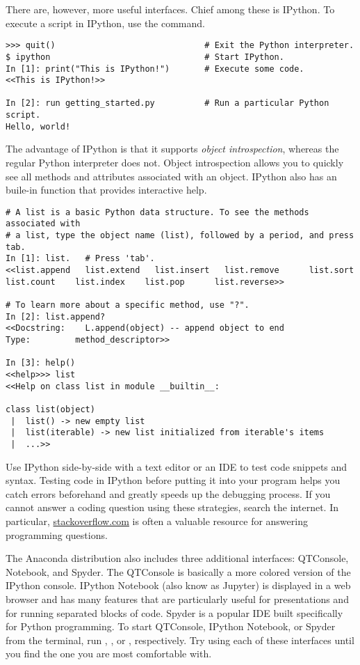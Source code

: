 There are, however, more useful interfaces.
Chief among these is IPython.
To execute a script in IPython, use the  command.

\begin{lstlisting}
>>> quit()                              # Exit the Python interpreter.
$ ipython                               # Start IPython.
In [1]: print("This is IPython!")       # Execute some code.
<<This is IPython!>>

In [2]: run getting_started.py          # Run a particular Python script.
Hello, world!
\end{lstlisting}

The advantage of IPython is that it supports \emph{object introspection}, whereas the regular Python interpreter does not.
Object introspection allows you to quickly see all methods and attributes associated with an object.
IPython also has an buile-in  function that provides interactive help.

\begin{lstlisting}
# A list is a basic Python data structure. To see the methods associated with
# a list, type the object name (list), followed by a period, and press tab.
In [1]: list.   # Press 'tab'.
<<list.append   list.extend   list.insert   list.remove      list.sort
list.count    list.index    list.pop      list.reverse>>

# To learn more about a specific method, use "?".
In [2]: list.append?
<<Docstring:    L.append(object) -- append object to end
Type:         method_descriptor>>

In [3]: help()
<<help>>> list
<<Help on class list in module __builtin__:

class list(object)
 |  list() -> new empty list
 |  list(iterable) -> new list initialized from iterable's items
 |  ...>>
\end{lstlisting}

Use IPython side-by-side with a text editor or an IDE to test code snippets and syntax.
Testing code in IPython before putting it into your program helps you catch errors beforehand and greatly speeds up the debugging process.
If you cannot answer a coding question using these strategies, search the internet.
In particular, \href{http://stackoverflow.com/}{stackoverflow.com} is often a valuable resource for answering programming questions.

The Anaconda distribution also includes three additional interfaces: QTConsole, Notebook, and Spyder.
The QTConsole is basically a more colored version of the IPython console.
IPython Notebook (also know as Jupyter) is displayed in a web browser and has many features that are particularly useful for presentations and for running separated blocks of code.
Spyder is a popular IDE built specifically for Python programming.
To start QTConsole, IPython Notebook, or Spyder from the terminal, run , , or , respectively.
Try using each of these interfaces until you find the one you are most comfortable with.

